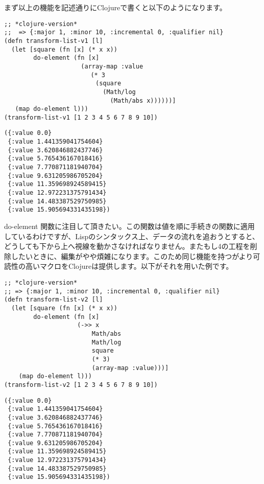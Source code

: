 \documentclass[a4paper, dvipdfmx, 12pt]{article}
\begin{document}
まず以上の機能を記述通りにClojureで書くと以下のようになります。\\

\begin{verbatim}
;; *clojure-version*
;;  => {:major 1, :minor 10, :incremental 0, :qualifier nil}
(defn transform-list-v1 [l]
  (let [square (fn [x] (* x x))
        do-element (fn [x]
                     (array-map :value 
                      　(* 3
                         (square  
                           (Math/log 
                             (Math/abs x))))))]
   (map do-element l)))
(transform-list-v1 [1 2 3 4 5 6 7 8 9 10])
\end{verbatim}

\begin{verbatim}
({:value 0.0}
 {:value 1.441359041754604}
 {:value 3.620846882437746}
 {:value 5.765436167018416}
 {:value 7.770871181940704}
 {:value 9.631205986705204}
 {:value 11.359698924589415}
 {:value 12.972231375791434}
 {:value 14.483387529750985}
 {:value 15.905694331435198})
\end{verbatim}

do-element 関数に注目して頂きたい。この関数は値を順に手続きの関数に適用しているわけですが、Lispのシンタックス上、データの流れを追おうとすると、どうしても下から上へ視線を動かさなければなりません。またもし4の工程を削除したいときに、編集がやや煩雑になります。このため同じ機能を持つがより可読性の高いマクロをClojureは提供します。以下がそれを用いた例です。\\

\begin{verbatim}
;; *clojure-version*
;; => {:major 1, :minor 10, :incremental 0, :qualifier nil}
(defn transform-list-v2 [l]
  (let [square (fn [x] (* x x))
        do-element (fn [x]
                    (->> x 
                        Math/abs 
                        Math/log
                        square 
                        (* 3) 
                        (array-map :value)))]
    (map do-element l)))
(transform-list-v2 [1 2 3 4 5 6 7 8 9 10])
\end{verbatim}

\begin{verbatim}
({:value 0.0}
 {:value 1.441359041754604}
 {:value 3.620846882437746}
 {:value 5.765436167018416}
 {:value 7.770871181940704}
 {:value 9.631205986705204}
 {:value 11.359698924589415}
 {:value 12.972231375791434}
 {:value 14.483387529750985}
 {:value 15.905694331435198})
\end{verbatim}
\end{document}
